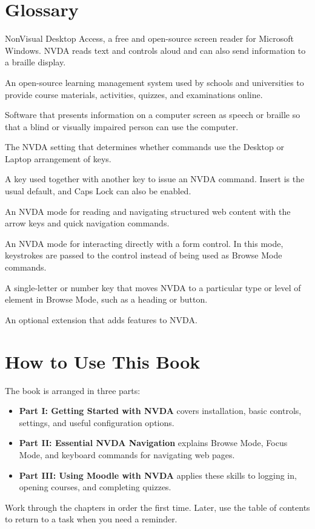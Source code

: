 \documentclass[11pt,oneside]{book}
\begin{document}
\chapter*{Glossary}
\begin{description}[style=nextline,leftmargin=0pt,labelindent=0pt,labelwidth=0pt]
	\item[NVDA] NonVisual Desktop Access, a free and open-source screen reader for Microsoft Windows. NVDA reads text and controls aloud and can also send information to a braille display.
	\item[Moodle] An open-source learning management system used by schools and universities to provide course materials, activities, quizzes, and examinations online.
	\item[Screen reader] Software that presents information on a computer screen as speech or braille so that a blind or visually impaired person can use the computer.
	\item[Keyboard layout] The NVDA setting that determines whether commands use the Desktop or Laptop arrangement of keys.
	\item[NVDA modifier key] A key used together with another key to issue an NVDA command. Insert is the usual default, and Caps Lock can also be enabled.
	\item[Browse Mode] An NVDA mode for reading and navigating structured web content with the arrow keys and quick navigation commands.
	\item[Focus Mode] An NVDA mode for interacting directly with a form control. In this mode, keystrokes are passed to the control instead of being used as Browse Mode commands.
	\item[Quick navigation key] A single-letter or number key that moves NVDA to a particular type or level of element in Browse Mode, such as a heading or button.
	\item[Add-on] An optional extension that adds features to NVDA.
\end{description}

\chapter*{How to Use This Book}
The book is arranged in three parts:
\begin{itemize}
	\item \textbf{Part I: Getting Started with NVDA} covers installation, basic controls, settings, and useful configuration options.
	\item \textbf{Part II: Essential NVDA Navigation} explains Browse Mode, Focus Mode, and keyboard commands for navigating web pages.
	\item \textbf{Part III: Using Moodle with NVDA} applies these skills to logging in, opening courses, and completing quizzes.
\end{itemize}
Work through the chapters in order the first time. Later, use the table of contents to return to a task when you need a reminder.
\end{document}
